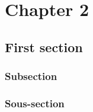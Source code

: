 
\chapter{Chapter 2} \label{chap2:title}
\section{First section}

\subsection{Subsection}

\subsection{Sous-section}
